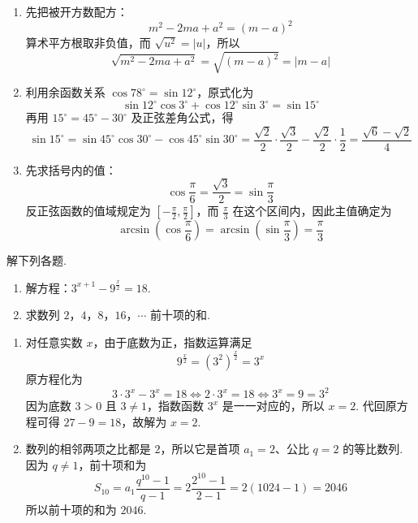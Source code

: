 \begin{solution}
\begin{enumerate}
    \item 先把被开方数配方：
    \[
    m^2-2ma+a^2=(m-a)^2
    \]
    算术平方根取非负值，而 \(\sqrt{u^2}=\left|u\right|\)，所以
    \[
    \sqrt{m^2-2ma+a^2}=\sqrt{(m-a)^2}=\left|m-a\right|
    \]
    \item 利用余函数关系 \(\cos78^\circ=\sin12^\circ\)，原式化为
    \[
    \sin12^\circ\cos3^\circ+\cos12^\circ\sin3^\circ
    =\sin15^\circ
    \]
    再用 \(15^\circ=45^\circ-30^\circ\) 及正弦差角公式，得
    \[
    \sin15^\circ=\sin45^\circ\cos30^\circ-\cos45^\circ\sin30^\circ
    =\frac{\sqrt2}{2}\cdot\frac{\sqrt3}{2}-\frac{\sqrt2}{2}\cdot\frac12
    =\frac{\sqrt6-\sqrt2}{4}
    \]
    \item 先求括号内的值：
    \[
    \cos\frac\pi6=\frac{\sqrt3}{2}=\sin\frac\pi3
    \]
    反正弦函数的值域规定为 \(\left[-\frac\pi2,\frac\pi2\right]\)，而 \(\frac\pi3\) 在这个区间内，因此主值确定为
    \[
    \arcsin\left(\cos\frac\pi6\right)=\arcsin\left(\sin\frac\pi3\right)=\frac\pi3
    \]
\end{enumerate}
\end{solution}

\begin{problem}
解下列各题.

\begin{enumerate}
    \item 解方程：\(3^{x+1}-9^{\frac{x}{2}}=18\).

    \item 求数列 \(2\)，\(4\)，\(8\)，\(16\)，\(\cdots\) 前十项的和.
\end{enumerate}
\end{problem}

\begin{solution}
\begin{enumerate}
    \item 对任意实数 \(x\)，由于底数为正，指数运算满足
    \[
    9^{\frac x2}=\left(3^2\right)^{\frac x2}=3^x
    \]
    原方程化为
    \[
    3\cdot3^x-3^x=18\Longleftrightarrow 2\cdot3^x=18
    \Longleftrightarrow 3^x=9=3^2
    \]
    因为底数 \(3>0\) 且 \(3\ne1\)，指数函数 \(3^x\) 是一一对应的，所以 \(x=2\). 代回原方程可得 \(27-9=18\)，故解为 \(x=2\).
    \item 数列的相邻两项之比都是 \(2\)，所以它是首项 \(a_1=2\)、公比 \(q=2\) 的等比数列. 因为 \(q\ne1\)，前十项和为
    \[
    S_{10}=a_1\frac{q^{10}-1}{q-1}=2\frac{2^{10}-1}{2-1}=2(1024-1)=2046
    \]
    所以前十项的和为 \(2046\).
\end{enumerate}
\end{solution}

